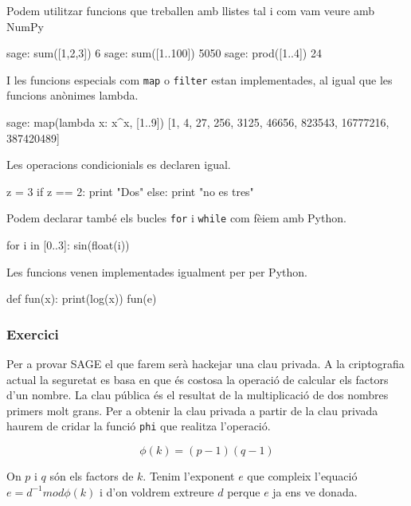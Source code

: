 Podem utilitzar funcions que treballen amb llistes tal i com vam veure amb NumPy

\begin{blockcode}
sage: sum([1,2,3])
6
sage: sum([1..100])
5050
sage: prod([1..4])
24
\end{blockcode}

I les funcions especials com {\tt map} o {\tt filter} estan implementades, al igual que les funcions anònimes lambda.

\begin{blockcode}
sage: map(lambda x: x^x, [1..9])
[1, 4, 27, 256, 3125, 46656, 823543, 16777216, 387420489]
\end{blockcode}

Les operacions condicionials es declaren igual.

\begin{blockcode}
z = 3
if z == 2:
    print "Dos"
else:
    print "no es tres"
\end{blockcode}
    
Podem declarar també els bucles {\tt for} i {\tt while} com fèiem amb Python.    

\begin{blockcode}
for i in [0..3]:
    sin(float(i))
\end{blockcode}



Les funcions venen implementades igualment per per Python.


\begin{blockcode}
def fun(x):
    print(log(x))
fun(e)
\end{blockcode}


\subsubsection*{Exercici } 

Per a provar SAGE el que farem serà hackejar una clau privada. A la criptografia actual la seguretat es basa en que és costosa la operació de calcular els factors d'un nombre. La clau pública és el resultat de la multiplicació de dos nombres primers molt grans. Per a obtenir la clau privada a partir de la clau privada haurem de cridar la funció {\tt phi} que realitza l'operació.

\[
\phi(k) = (p-1)(q-1)
\]

On $p$ i $q$ són els factors de $k$. Tenim l'exponent $e$ que compleix l'equació $e=d^{-1} mod \phi(k)$ i d'on voldrem extreure $d$ perque $e$ ja ens ve donada.




